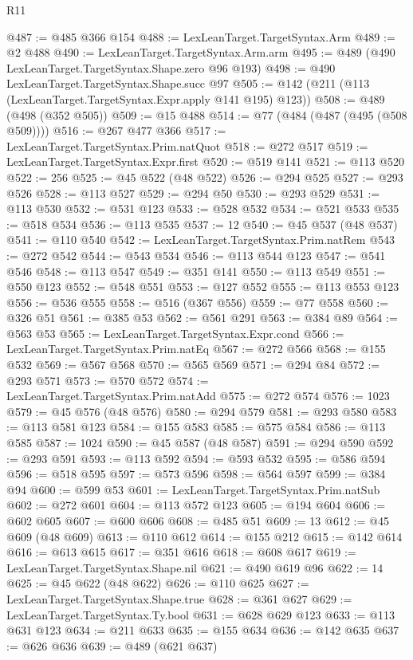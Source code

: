\begin{lexlean}{R11}
\begin{coremodule}
@487 := @485 @366 @154
@488 := LexLeanTarget.TargetSyntax.Arm
@489 := @2 @488
@490 := LexLeanTarget.TargetSyntax.Arm.arm
@495 := @489 (@490 LexLeanTarget.TargetSyntax.Shape.zero @96 @193)
@498 := @490 LexLeanTarget.TargetSyntax.Shape.succ @97
@505 := @142 (@211 (@113 (LexLeanTarget.TargetSyntax.Expr.apply @141 @195) @123))
@508 := @489 (@498 (@352 @505))
@509 := @15 @488
@514 := @77 (@484 (@487 (@495 (@508 @509))))
@516 := @267 @477 @366
@517 := LexLeanTarget.TargetSyntax.Prim.natQuot
@518 := @272 @517
@519 := LexLeanTarget.TargetSyntax.Expr.first
@520 := @519 @141
@521 := @113 @520
@522 := 256
@525 := @45 @522 (@48 @522)
@526 := @294 @525
@527 := @293 @526
@528 := @113 @527
@529 := @294 @50
@530 := @293 @529
@531 := @113 @530
@532 := @531 @123
@533 := @528 @532
@534 := @521 @533
@535 := @518 @534
@536 := @113 @535
@537 := 12
@540 := @45 @537 (@48 @537)
@541 := @110 @540
@542 := LexLeanTarget.TargetSyntax.Prim.natRem
@543 := @272 @542
@544 := @543 @534
@546 := @113 @544 @123
@547 := @541 @546
@548 := @113 @547
@549 := @351 @141
@550 := @113 @549
@551 := @550 @123
@552 := @548 @551
@553 := @127 @552
@555 := @113 @553 @123
@556 := @536 @555
@558 := @516 (@367 @556)
@559 := @77 @558
@560 := @326 @51
@561 := @385 @53
@562 := @561 @291
@563 := @384 @89
@564 := @563 @53
@565 := LexLeanTarget.TargetSyntax.Expr.cond
@566 := LexLeanTarget.TargetSyntax.Prim.natEq
@567 := @272 @566
@568 := @155 @532
@569 := @567 @568
@570 := @565 @569
@571 := @294 @84
@572 := @293 @571
@573 := @570 @572
@574 := LexLeanTarget.TargetSyntax.Prim.natAdd
@575 := @272 @574
@576 := 1023
@579 := @45 @576 (@48 @576)
@580 := @294 @579
@581 := @293 @580
@583 := @113 @581 @123
@584 := @155 @583
@585 := @575 @584
@586 := @113 @585
@587 := 1024
@590 := @45 @587 (@48 @587)
@591 := @294 @590
@592 := @293 @591
@593 := @113 @592
@594 := @593 @532
@595 := @586 @594
@596 := @518 @595
@597 := @573 @596
@598 := @564 @597
@599 := @384 @94
@600 := @599 @53
@601 := LexLeanTarget.TargetSyntax.Prim.natSub
@602 := @272 @601
@604 := @113 @572 @123
@605 := @194 @604
@606 := @602 @605
@607 := @600 @606
@608 := @485 @51
@609 := 13
@612 := @45 @609 (@48 @609)
@613 := @110 @612
@614 := @155 @212
@615 := @142 @614
@616 := @613 @615
@617 := @351 @616
@618 := @608 @617
@619 := LexLeanTarget.TargetSyntax.Shape.nil
@621 := @490 @619 @96
@622 := 14
@625 := @45 @622 (@48 @622)
@626 := @110 @625
@627 := LexLeanTarget.TargetSyntax.Shape.true
@628 := @361 @627
@629 := LexLeanTarget.TargetSyntax.Ty.bool
@631 := @628 @629 @123
@633 := @113 @631 @123
@634 := @211 @633
@635 := @155 @634
@636 := @142 @635
@637 := @626 @636
@639 := @489 (@621 @637)

\end{coremodule}
\end{lexlean}

